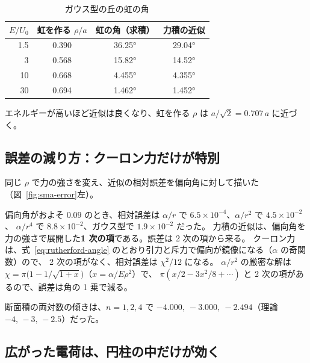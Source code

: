 \begin{table}[htbp]
\centering
\caption{ガウス型の丘の虹の角}\label{tab:rainbow}
\begin{tabular}{rccc}
\toprule
$E/U_0$ & 虹を作る $\rho/a$ & 虹の角（求積） & 力積の近似 \\
\midrule
1.5 & 0.390 & \ang{36.25} & \ang{29.04} \\
3   & 0.568 & \ang{15.82} & \ang{14.52} \\
10  & 0.668 & \ang{4.455} & \ang{4.355} \\
30  & 0.694 & \ang{1.462} & \ang{1.452} \\
\bottomrule
\end{tabular}
\end{table}

エネルギーが高いほど近似は良くなり、虹を作る $\rho$ は $a/\sqrt2=0.707\,a$ に近づく。

\subsection*{誤差の減り方：クーロン力だけが特別}

同じ $\rho$ で力の強さを変え、近似の相対誤差を偏向角に対して描いた（図~\ref{fig:sma-error}左）。


偏向角がおよそ $0.09$ のとき、相対誤差は $\alpha/r$ で $6.5\times10^{-4}$、$\alpha/r^2$ で $4.5\times10^{-2}$、
$\alpha/r^4$ で $8.8\times10^{-2}$、ガウス型で $1.9\times10^{-2}$ だった。
力積の近似は、偏向角を力の強さで展開した\textbf{1 次の項}である。誤差は 2 次の項から来る。
クーロン力は、式~\eqref{eq:rutherford-angle} のとおり引力と斥力で偏向が鏡像になる（$\alpha$ の奇関数）ので、
2 次の項がなく、相対誤差は $\chi^2/12$ になる。
$\alpha/r^2$ の厳密な解は $\chi=\pi\bigl(1-1/\sqrt{1+x}\bigr)$（$x=\alpha/E\rho^2$）で、
$\pi(x/2-3x^2/8+\cdots)$ と 2 次の項があるので、誤差は角の 1 乗で減る。

断面積の両対数の傾きは、$n=1,2,4$ で $-4.000,\ -3.000,\ -2.494$（理論 $-4,\,-3,\,-2.5$）だった。

\subsection*{広がった電荷は、円柱の中だけが効く}

